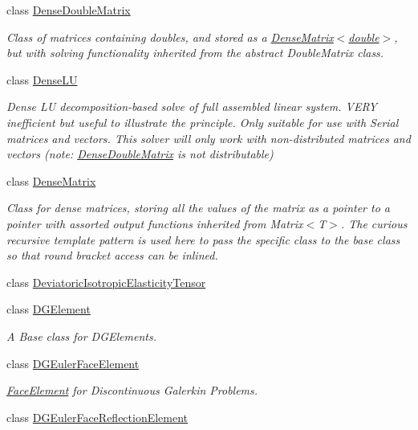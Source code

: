 \begin{DoxyCompactItemize}
class \hyperlink{classoomph_1_1DenseDoubleMatrix}{Dense\+Double\+Matrix}
\begin{DoxyCompactList}\small\item\em Class of matrices containing doubles, and stored as a \hyperlink{classoomph_1_1DenseMatrix}{Dense\+Matrix$<$double$>$}, but with solving functionality inherited from the abstract Double\+Matrix class. \end{DoxyCompactList}\item 
class \hyperlink{classoomph_1_1DenseLU}{Dense\+LU}
\begin{DoxyCompactList}\small\item\em Dense LU decomposition-\/based solve of full assembled linear system. V\+E\+RY inefficient but useful to illustrate the principle. Only suitable for use with Serial matrices and vectors. This solver will only work with non-\/distributed matrices and vectors (note\+: \hyperlink{classoomph_1_1DenseDoubleMatrix}{Dense\+Double\+Matrix} is not distributable) \end{DoxyCompactList}\item 
class \hyperlink{classoomph_1_1DenseMatrix}{Dense\+Matrix}
\begin{DoxyCompactList}\small\item\em Class for dense matrices, storing all the values of the matrix as a pointer to a pointer with assorted output functions inherited from Matrix$<$\+T$>$. The curious recursive template pattern is used here to pass the specific class to the base class so that round bracket access can be inlined. \end{DoxyCompactList}\item 
class \hyperlink{classoomph_1_1DeviatoricIsotropicElasticityTensor}{Deviatoric\+Isotropic\+Elasticity\+Tensor}
\item 
class \hyperlink{classoomph_1_1DGElement}{D\+G\+Element}
\begin{DoxyCompactList}\small\item\em A Base class for D\+G\+Elements. \end{DoxyCompactList}\item 
class \hyperlink{classoomph_1_1DGEulerFaceElement}{D\+G\+Euler\+Face\+Element}
\begin{DoxyCompactList}\small\item\em \hyperlink{classoomph_1_1FaceElement}{Face\+Element} for Discontinuous Galerkin Problems. \end{DoxyCompactList}\item 
class \hyperlink{classoomph_1_1DGEulerFaceReflectionElement}{D\+G\+Euler\+Face\+Reflection\+Element}

\end{DoxyCompactItemize}
